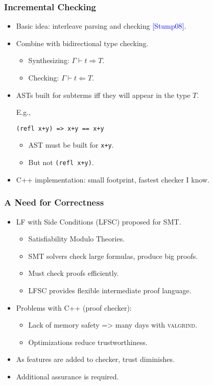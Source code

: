 \documentclass[11pt]{beamer}
\begin{document}
\begin{frame}[containsverbatim]
\frametitle{Incremental Checking}
\begin{itemize}
\item Basic idea: interleave parsing and checking \textcolor{blue}{[Stump08]}.
\item Combine with bidirectional type checking.
\begin{itemize}
\item Synthesizing: $\Gamma \vdash t \Rightarrow T$.
\item Checking: $\Gamma \vdash t \Leftarrow T$.
\end{itemize}
\item ASTs built for subterms iff they will appear in the type $T$.

E.g., 

\begin{verbatim}
(refl x+y) => x+y == x+y
\end{verbatim}

\begin{itemize}
\item AST must be built for \texttt{x+y}.
\item But not \texttt{(refl x+y)}.
\end{itemize}

\item C++ implementation: small footprint, fastest checker I know.

\end{itemize}
\end{frame}

\begin{frame}
\frametitle{A Need for Correctness}

\begin{itemize}
\item LF with Side Conditions (LFSC) proposed for SMT.
\begin{itemize}
\item Satisfiability Modulo Theories.
\item SMT solvers check large formulas, produce big proofs.
\item Must check proofs efficiently.
\item LFSC provides flexible intermediate proof language.
\end{itemize}
\item Problems with C++ (proof checker):
\begin{itemize}
\item Lack of memory safety => many days with \textsc{valgrind}.
\item Optimizations reduce trustworthiness.
\end{itemize}
\item As features are added to checker, trust diminishes.
\item Additional assurance is required.
\end{itemize}
\end{frame}
\end{document}
